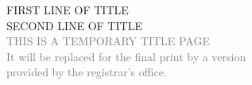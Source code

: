 
\begin{titlepage}
    \begin{otherlanguage}{french}
        \begin{center}
            \sffamily


            \null\vspace{2cm}
            {\huge FIRST LINE OF TITLE \\[12pt] SECOND LINE OF TITLE} \\[24pt]
            \textcolor{gray}{\small{THIS IS A TEMPORARY TITLE PAGE \\ It will be replaced for the final print by a version \\ provided by the registrar's office.}}

            \vfill


\end{center}
\end{otherlanguage}
\end{titlepage}
